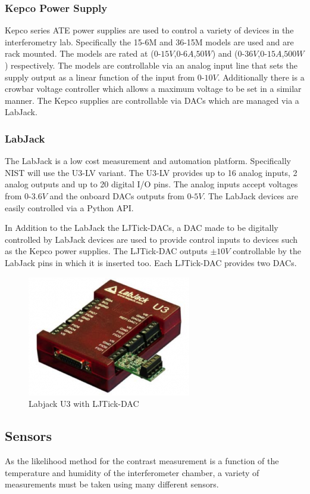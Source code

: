 \subsubsection{Kepco Power Supply}
Kepco series ATE power supplies are used to control a variety of devices in the interferometry lab. Specifically the 15-6M and 36-15M models are used and are rack mounted. The models are rated at ($0$-$15V$,$0$-$6A$,$50W$) and ($0$-$36V$,$0$-$15A$,$500W$) respectively.\cite{kepco} The models are controllable via an analog input line that sets the supply output as a linear function of the input from $0$-$10V$. Additionally there is a crowbar voltage controller which allows a maximum voltage to be set in a similar manner. The Kepco supplies are controllable via DACs which are managed via a LabJack. 
\subsubsection{LabJack}
The LabJack is a low cost measurement and automation platform. Specifically NIST will use the U3-LV variant. The U3-LV provides up to 16 analog inputs, 2 analog outputs and up to 20 digital I/O pins. The analog inputs accept voltages from $0$-$3.6V$ and the onboard DACs outputs from $0$-$5V$. The LabJack devices are easily controlled via a Python API. 

In Addition to the LabJack the LJTick-DACs, a DAC made to be digitally controlled by LabJack devices are used to provide control inputs to devices such as the Kepco power supplies. The LJTick-DAC outputs $\pm10V$  controllable by the LabJack pins in which it is inserted too. Each LJTick-DAC provides two DACs. 
\begin{figure}[ht!]
\centering
\includegraphics[scale=0.5]{Figures/labjack.png}
\caption{Labjack U3 with LJTick-DAC}
\label{fig:labjack}
\end{figure}
\subsection{Sensors}
As the likelihood method for the contrast measurement is a function of the temperature and humidity of the interferometer chamber, a variety of measurements must be taken using many different sensors.
